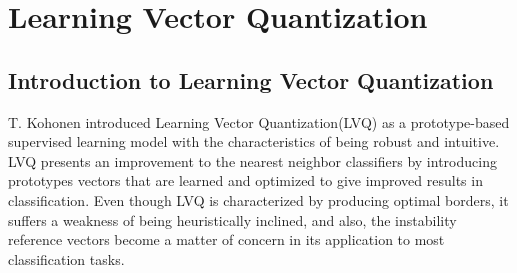 \documentclass[english]{HSMW-Thesis}
\begin{document}
\chapter{Learning Vector Quantization}

\section{Introduction to Learning Vector Quantization}
T. Kohonen introduced Learning Vector Quantization(LVQ) as a prototype-based supervised learning model with the characteristics of being robust and intuitive\cite{kohonen2001learning}. LVQ presents an improvement to the nearest neighbor classifiers by introducing prototypes vectors that are learned and optimized to give improved results in classification\cite{kaden2014aspects}. Even though LVQ is characterized by producing optimal borders, it suffers a weakness of being heuristically inclined, and also, the instability reference vectors become a matter of concern in its application to most classification tasks\cite{kohonen2001learning,article}.
\end{document}
